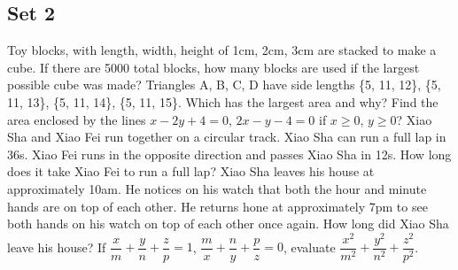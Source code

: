 \documentclass[11pt,a4paper,twoside,UTF8]{exam}
\begin{document}
\subsection*{Set 2}
\begin{questions}
	\question
	Toy blocks, with length, width, height of 1cm, 2cm, 3cm are stacked to make a cube. If there are 5000 total blocks, how many blocks are used if the largest possible cube was made?
	\question
	Triangles A, B, C, D have side lengths \{5, 11, 12\}, \{5, 11, 13\}, \{5, 11, 14\}, \{5, 11, 15\}. Which has the largest area and why?
	\question
	Find the area enclosed by the lines $x - 2y + 4 = 0$, $2x - y - 4 = 0$ if $x \geq 0$, $y \geq 0$?
	\question
	Xiao Sha and Xiao Fei run together on a circular track. Xiao Sha can run a full lap in 36s. Xiao Fei runs in the opposite direction and passes Xiao Sha in 12s. How long does it take Xiao Fei to run a full lap?
	\question
	Xiao Sha leaves his house at approximately 10am. He notices on his watch that both the hour and minute hands are on top of each other. He returns hone at approximately 7pm to see both hands on his watch on top of each other once again. How long did Xiao Sha leave his house?
	\setcounter{question}{8}
	\question
	If $\dfrac{x}{m} + \dfrac{y}{n} + \dfrac{z}{p} = 1$, $\dfrac{m}{x} + \dfrac{n}{y} + \dfrac{p}{z} = 0$, evaluate $\dfrac{x^2}{m^2} + \dfrac{y^2}{n^2} + \dfrac{z^2}{p^2}$.
\end{questions}
\end{document}
